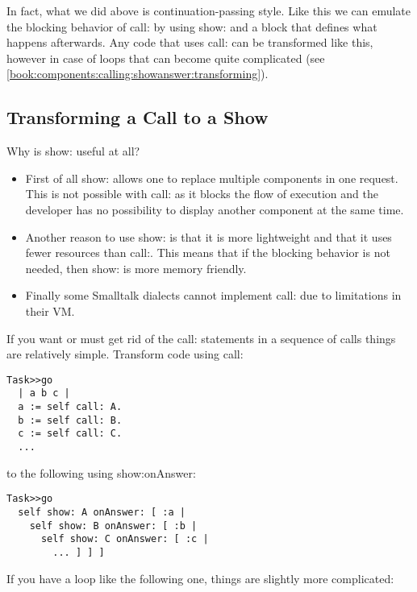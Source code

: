 \documentclass[a4paper,10pt,twoside]{book}
\newcommand{\ct}[1]{{\small\ttfamily\textup{#1}}}
\begin{document}
In fact, what we did above is continuation-passing style. Like this we can emulate the blocking behavior of \ct{call:} by using \ct{show:} and a block that defines what happens afterwards. Any code that uses \ct{call:} can be transformed like this, however in case of loops that can become quite complicated (see \autoref{book:components:calling:showanswer:transforming}).

\subsection{Transforming a Call to a Show}
\label{book:components:calling:showanswer:transforming}

Why is \ct{show:} useful at all? 

\begin{itemize}
\item  First of all \ct{show:} allows one to replace multiple components in one request. This is not possible with \ct{call:} as it blocks the flow of execution and the developer has no possibility to display another component at the same time. 
\item  Another reason to use \ct{show:} is that it is more lightweight and that it uses fewer resources than \ct{call:}. This means that if the blocking behavior is not needed, then \ct{show:} is more memory friendly. 
\item  Finally some Smalltalk dialects cannot implement \ct{call:} due to limitations in their VM.
\end{itemize}

If you want or must get rid of the \ct{call:} statements in a sequence of calls things are relatively simple. Transform code using \ct{call:}

\begin{lstlisting}
Task>>go
  | a b c |
  a := self call: A.
  b := self call: B.
  c := self call: C.
  ...
\end{lstlisting}

to the following using \ct{show:onAnswer:}

\begin{lstlisting}
Task>>go
  self show: A onAnswer: [ :a |
    self show: B onAnswer: [ :b |
      self show: C onAnswer: [ :c |
        ... ] ] ]
\end{lstlisting}

If you have a loop like the following one, things are slightly more complicated:
\end{document}
